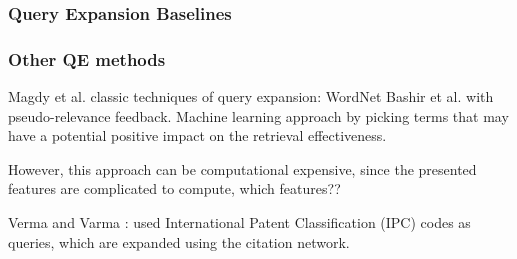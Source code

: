 \documentclass[xcolor=x11names,compress]{beamer}
\renewcommand{\(}{\begin{columns}}
\renewcommand{\)}{\end{columns}}
\newcommand{\<}[1]{\begin{column}{#1}}
\renewcommand{\>}{\end{column}}
\begin{document}
\begin{frame}
\frametitle{Query Expansion Baselines}






\end{frame}


\begin{frame}
\frametitle{Other QE methods}


Magdy et al. \cite{Magdy2011} classic
techniques of query expansion: WordNet
Bashir et al. \cite{Bashir2010} with pseudo-relevance
feedback. Machine learning approach by picking terms that may
have a potential positive impact on the retrieval effectiveness. 

However, this approach can be computational expensive, since the presented
features are complicated to compute, which features??

Verma and Varma \cite{Verma2011}: used International Patent Classification (IPC) codes as queries, which are expanded using the citation network. 

\end{frame}
\end{document}
